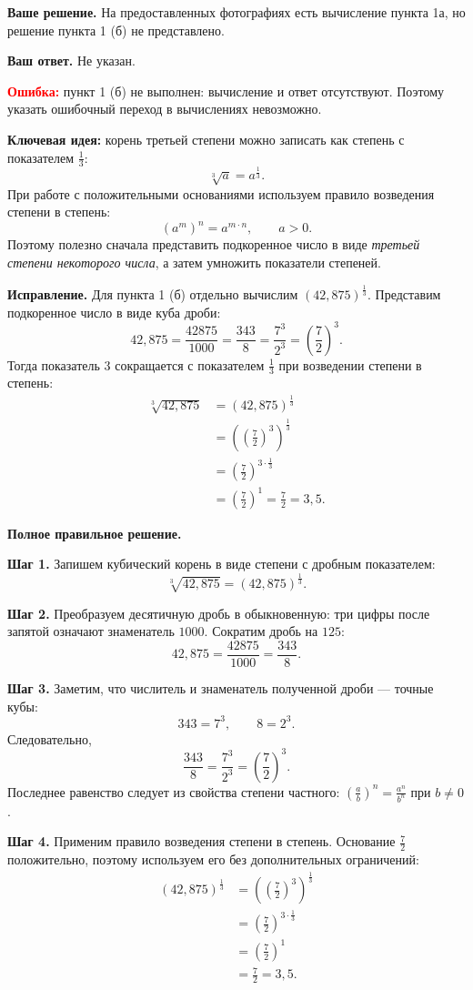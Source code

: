 \documentclass[12pt,a4paper]{article}
\begin{document}
\textbf{Ваше решение.} На предоставленных фотографиях есть вычисление пункта 1а, но решение пункта 1 (б) не представлено.

\textbf{Ваш ответ.} Не указан.

\textcolor{red}{\textbf{Ошибка:}} пункт 1 (б) не выполнен: вычисление и ответ отсутствуют. Поэтому указать ошибочный переход в вычислениях невозможно.

\textcolor{blue!60!black}{\textbf{Ключевая идея:}} корень третьей степени можно записать как степень с показателем $\frac13$:
\[
\sqrt[3]{a}=a^{\frac13}.
\]
При работе с положительными основаниями используем правило возведения степени в степень:
\[
\left(a^m\right)^n=a^{m\cdot n},\qquad a>0.
\]
Поэтому полезно сначала представить подкоренное число в виде \emph{третьей степени некоторого числа}, а затем умножить показатели степеней.

\textbf{Исправление.} Для пункта 1 (б) отдельно вычислим $(42{,}875)^{\frac13}$. Представим подкоренное число в виде куба дроби:
\[
42{,}875=\frac{42875}{1000}=\frac{343}{8}
=\frac{7^3}{2^3}=\left(\frac72\right)^3.
\]
Тогда показатель $3$ сокращается с показателем $\frac13$ при возведении степени в степень:
\[
\begin{aligned}
\sqrt[3]{42{,}875}
 &=\left(42{,}875\right)^{\frac13}\\
 &=\left(\left(\frac72\right)^3\right)^{\frac13}\\
 &=\left(\frac72\right)^{3\cdot\frac13}\\
 &=\left(\frac72\right)^1=\frac72=3{,}5.
\end{aligned}
\]

\textbf{Полное правильное решение.}

\textbf{Шаг 1.} Запишем кубический корень в виде степени с дробным показателем:
\[
\sqrt[3]{42{,}875}=\left(42{,}875\right)^{\frac13}.
\]

\textbf{Шаг 2.} Преобразуем десятичную дробь в обыкновенную: три цифры после запятой означают знаменатель $1000$. Сократим дробь на $125$:
\[
42{,}875=\frac{42875}{1000}=\frac{343}{8}.
\]

\textbf{Шаг 3.} Заметим, что числитель и знаменатель полученной дроби --- точные кубы:
\[
343=7^3,\qquad 8=2^3.
\]
Следовательно,
\[
\frac{343}{8}=\frac{7^3}{2^3}=\left(\frac72\right)^3.
\]
Последнее равенство следует из свойства степени частного: $\left(\frac ab\right)^n=\frac{a^n}{b^n}$ при $b\ne0$.

\textbf{Шаг 4.} Применим правило возведения степени в степень. Основание $\frac72$ положительно, поэтому используем его без дополнительных ограничений:
\[
\begin{aligned}
\left(42{,}875\right)^{\frac13}
 &=\left(\left(\frac72\right)^3\right)^{\frac13}\\
 &=\left(\frac72\right)^{3\cdot\frac13}\\
 &=\left(\frac72\right)^1\\
 &=\frac72=3{,}5.
\end{aligned}
\]
\end{document}
